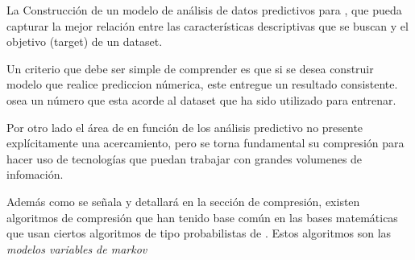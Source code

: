 

La Construcción de un modelo de análisis de datos predictivos para \machinelearning, que pueda capturar  la mejor relación entre las características descriptivas que se buscan y el objetivo (target) de un dataset.

Un criterio que debe ser simple de comprender es que si se desea construir modelo que realice prediccion númerica, este entregue un resultado consistente. osea un número que esta acorde al dataset que ha sido utilizado para entrenar.





Por otro lado el área de \losslessdatacompression en función de los análisis predictivo no presente explícitamente una acercamiento, pero se torna fundamental su compresión para hacer uso de tecnologías que puedan trabajar con grandes volumenes de infomación.




Además como se señala y detallará en la sección de compresión, existen algoritmos de compresión que han tenido base común en las bases matemáticas que usan ciertos algoritmos de tipo probabilistas de \machinelearning. Estos algoritmos son las \emph{modelos variables de markov}










